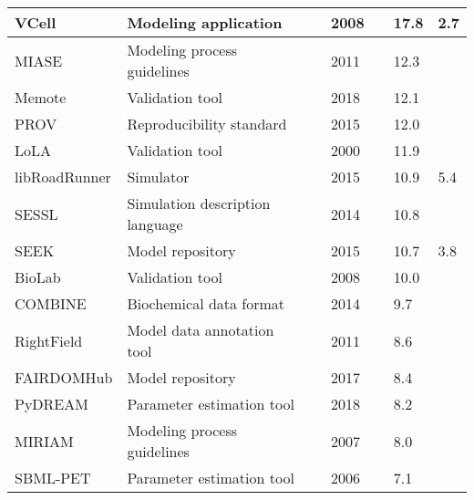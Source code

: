 \begin{longtable}{L{2.2cm}L{4cm}L{1cm}L{0.8cm}R{1.1cm}R{1cm}R{1cm}}
\midrule
\small{VCell} &\small{Modeling application} &\cite{moraru2008virtual} &\small{2008} &\small{} &\small{17.8} &\small{2.7}\\
\midrule
\small{MIASE} &\small{Modeling process guidelines} &\cite{Waltemath2011MinimumMIASE} &\small{2011} &\small{} &\small{12.3} &\small{}\\
\midrule
\small{Memote} &\small{Validation tool} &\cite{Lieven2018Memote:Suite} &\small{2018} &\small{} &\small{12.1} &\small{}\\
\midrule
\small{PROV} &\small{Reproducibility standard} &\cite{Moreau2015ThePROV} &\small{2015} &\small{} &\small{12.0} &\small{}\\
\midrule
\small{LoLA} &\small{Validation tool} &\cite{Schmidt2000LoLAAnalyser} &\small{2000} &\small{} &\small{11.9} &\small{}\\
\midrule
\small{libRoadRunner} &\small{Simulator} &\cite{Somogyi2015LibRoadRunner:Library.} &\small{2015} &\small{} &\small{10.9} &\small{5.4}\\
\midrule
\small{SESSL} &\small{Simulation description language} &\cite{Ewald2014SESSL:Experiments} &\small{2014} &\small{} &\small{10.8} &\small{}\\
\midrule
\small{SEEK} &\small{Model repository} &\cite{Wolstencroft2015SEEK:Platform} &\small{2015} &\small{} &\small{10.7} &\small{3.8}\\
\midrule
\small{BioLab} &\small{Validation tool} &\cite{Clarke2008StatisticalPathway} &\small{2008} &\small{} &\small{10.0} &\small{}\\
\midrule
\small{COMBINE} &\small{Biochemical data format} &\cite{Bergmann2014COMBINEProject} &\small{2014} &\small{} &\small{9.7} &\small{}\\
\midrule
\small{RightField} &\small{Model data annotation tool} &\cite{Wolstencroft2011RightField:Spreadsheets} &\small{2011} &\small{} &\small{8.6} &\small{}\\
\midrule
\small{FAIRDOMHub} &\small{Model repository} &\cite{Wolstencroft2017FAIRDOMHub:Research.} &\small{2017} &\small{} &\small{8.4} &\small{}\\
\midrule
\small{PyDREAM} &\small{Parameter estimation tool} &\cite{Shockley2018PyDREAM:Python} &\small{2018} &\small{} &\small{8.2} &\small{}\\
\midrule
\small{MIRIAM} &\small{Modeling process guidelines} &\cite{Laibe2007MIRIAMBiology.} &\small{2007} &\small{} &\small{8.0} &\small{}\\
\midrule
\small{SBML-PET} &\small{Parameter estimation tool} &\cite{Zi2006SBML-PET:Tool} &\small{2006} &\small{} &\small{7.1} &\small{}\\

\end{longtable}
